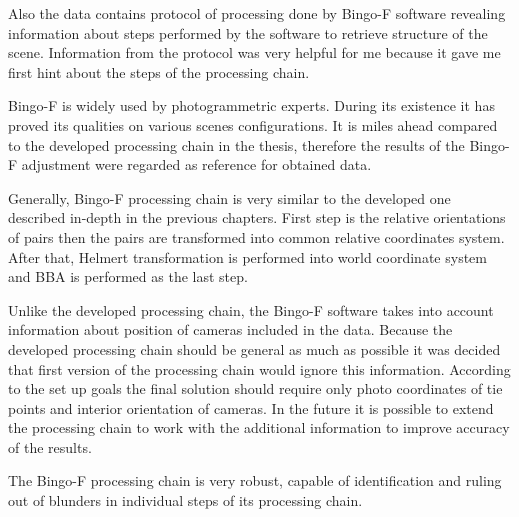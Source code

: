 \documentclass[a4paper,12pt]{article}
\begin{document}
Also the data contains protocol of processing done by Bingo-F software \cite{bingo2013gip} revealing 
information about steps performed by the software to retrieve structure of the scene.
Information from the protocol was very helpful for me because 
it gave me first hint about the steps of the processing chain.

Bingo-F is widely used by photogrammetric experts. During its existence it has proved its qualities on various scenes configurations.  
It is miles ahead compared to the developed processing chain in the thesis, therefore the results of the Bingo-F adjustment were 
regarded as reference for obtained data.

Generally, Bingo-F processing chain is very similar to the developed  one  
described in-depth in the previous chapters. First step is the relative orientations of pairs then the pairs are transformed into common relative 
coordinates system. After that, Helmert transformation is performed into world coordinate system and BBA is performed as the last step.

Unlike the developed processing chain, the Bingo-F software takes into account information about position of cameras included in the data. 
Because the developed processing chain should be general as much as possible it was decided that first version of the processing chain would ignore this 
information. According to the set up goals the final solution should require only photo coordinates of tie points and interior 
orientation of cameras. In the future it is possible to extend the processing chain to work with the additional information to improve accuracy 
of the results. 

The Bingo-F processing chain is very robust,
capable of identification and ruling out of blunders in individual steps of its processing chain.
\end{document}
